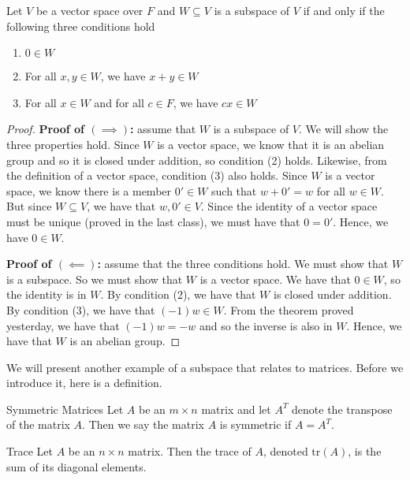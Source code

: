 \documentclass[main.tex]{subfiles}
\begin{document}
    \begin{thrm}{}{}
        Let $V$ be a vector space over $F$ and $W \subseteq V$ is a subspace of $V$ if and only if the following three conditions hold
        \begin{enumerate}
            \item $0\in W$
            \item For all $x, y\in W$, we have $x+y\in W$
            \item For all $x\in W$ and for all $c\in F$, we have $cx\in W$
        \end{enumerate}
    \end{thrm}
    \begin{proof}
        \textbf{Proof of $(\implies)$:} assume that $W$ is a subspace of $V$. We will show the three properties hold. Since $W$ is a vector space, we know that it is an abelian group and so it is closed under addition, so condition (2) holds. Likewise, from the definition of a vector space, condition (3) also holds. Since $W$ is a vector space, we know there is a member $0' \in W$ such that $w + 0' = w$ for all $w\in W$. But since $W \subseteq V$, we have that $w, 0' \in V$. Since the identity of a vector space must be unique (proved in the last class), we must have that $0 = 0'$. Hence, we have $0 \in W$. \bigbreak 

        \textbf{Proof of $(\impliedby)$:} assume that the three conditions hold. We must show that $W$ is a subspace. So we must show that $W$ is a vector space. We have that $0\in W$, so the identity is in $W$. By condition (2), we have that $W$ is closed under addition. By condition (3), we have that $(-1)w\in W$. From the theorem proved yesterday, we have that $(-1)w = -w$ and so the inverse is also in $W$. Hence, we have that $W$ is an abelian group. 
    \end{proof}

    We will present another example of a subspace that relates to matrices. Before we introduce it, here is a definition. 
    \begin{defn}{Symmetric Matrices}{}
        Let $A$ be an $m\times n$ matrix and let $A^T$ denote the transpose of the matrix $A$. Then we say the matrix $A$ is symmetric if $A = A^T$.
    \end{defn}

    \begin{defn}{Trace}{}
        Let $A$ be an $n\times n$ matrix. Then the trace of $A$, denoted $\mathrm{tr}(A)$, is the sum of its diagonal elements. 
    \end{defn}
\end{document}

